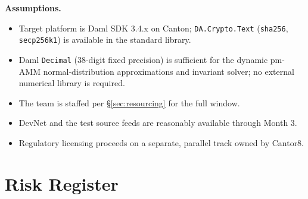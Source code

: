 \documentclass[11pt,a4paper]{article}
\begin{document}
\textbf{Assumptions.}
\begin{itemize}[leftmargin=2em, itemsep=2pt]
\item Target platform is Daml SDK 3.4.x on Canton; \texttt{DA.Crypto.Text} (\texttt{sha256}, \texttt{secp256k1}) is available in the standard library.
\item Daml \texttt{Decimal} (38-digit fixed precision) is sufficient for the dynamic pm-AMM normal-distribution approximations and invariant solver; no external numerical library is required.
\item The team is staffed per \S\ref{sec:resourcing} for the full window.
\item DevNet and the test source feeds are reasonably available through Month 3.
\item Regulatory licensing proceeds on a separate, parallel track owned by Cantor8.
\end{itemize}

\section{Risk Register}
\end{document}
